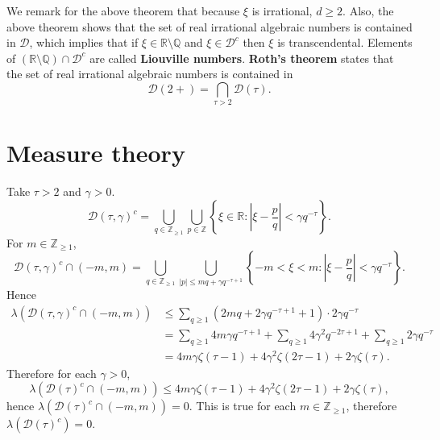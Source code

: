 \documentclass{article}
\theoremstyle{definition}
\begin{document}
We remark for the above theorem that because $\xi$ is irrational, $d \geq 2$. Also, the above theorem shows that
the set of  real irrational algebraic numbers is contained in $\mathcal{D}$, which implies that if
$\xi \in \mathbb{R} \setminus \mathbb{Q}$ and $\xi \in \mathcal{D}^c$ then $\xi$ is transcendental. 
Elements of $(\mathbb{R}  \setminus \mathbb{Q}) \cap \mathcal{D}^c$ are called \textbf{Liouville numbers}.
\textbf{Roth's theorem} states that the  set of real irrational algebraic numbers is contained in
\[
\mathcal{D}(2+) = \bigcap_{\tau>2} \mathcal{D}(\tau).
\]





\section{Measure theory}
Take $\tau>2$ and $\gamma>0$.
\[
\mathcal{D}(\tau,\gamma)^c = \bigcup_{q \in \mathbb{Z}_{\geq 1}} \bigcup_{p \in \mathbb{Z}} \left\{\xi \in \mathbb{R}:
\left| \xi - \frac{p}{q} \right| < \gamma q^{-\tau}\right\}.
\]
For $m \in \mathbb{Z}_{\geq 1}$, 
\[
\mathcal{D}(\tau,\gamma)^c  \cap (-m,m)
=\bigcup_{q \in \mathbb{Z}_{\geq 1}} \bigcup_{|p| \leq mq+\gamma q^{-\tau+1}} \left\{ -m<\xi<m: \left| \xi - \frac{p}{q} \right| < \gamma q^{-\tau} \right\}.
\]
Hence
\begin{align*}
\lambda(\mathcal{D}(\tau,\gamma)^c  \cap (-m,m))&\leq \sum_{q \geq 1} (2mq+2\gamma q^{-\tau+1}+1) \cdot 2\gamma q^{-\tau}\\
&=\sum_{q \geq 1} 4m\gamma q^{-\tau+1} + \sum_{q \geq 1} 4\gamma^2 q^{-2\tau+1} + \sum_{q \geq 1} 2\gamma q^{-\tau}\\
&=4m\gamma \zeta(\tau-1) + 4\gamma^2 \zeta(2\tau-1) + 2\gamma \zeta(\tau).
\end{align*}
Therefore for each $\gamma>0$,
\[
\lambda(\mathcal{D}(\tau)^c \cap (-m,m)) \leq 4m\gamma \zeta(\tau-1) + 4\gamma^2 \zeta(2\tau-1) + 2\gamma \zeta(\tau),
\]
hence $\lambda(\mathcal{D}(\tau)^c \cap (-m,m))=0$. This is true for each $m \in \mathbb{Z}_{\geq 1}$, therefore
$\lambda(\mathcal{D}(\tau)^c)=0$. 
\end{document}

